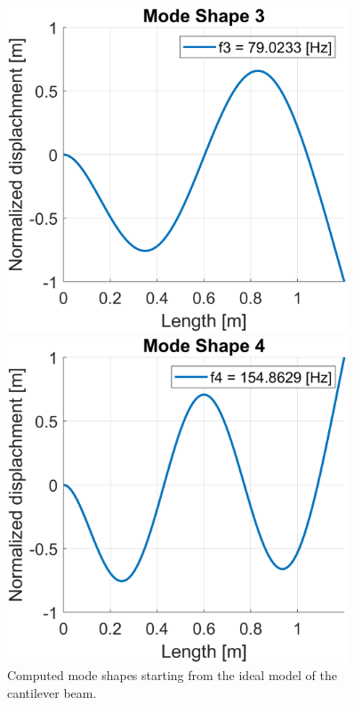 \begin{figure}[H]
\begin{minipage}[b]{0.45\textwidth}
    \end{minipage}
    \begin{minipage}[b]{0.45\textwidth}
        \centering
        \includegraphics[width=0.9\textwidth]{img/MATLAB/Part_A/Mode_shapes/mode_shape_03.png}
    \end{minipage}
    \hfill
    \begin{minipage}[b]{0.45\textwidth}
        \centering
        \includegraphics[width=0.9\textwidth]{img/MATLAB/Part_A/Mode_shapes/mode_shape_04.png}
    \end{minipage}
    \caption{Computed mode shapes starting from the ideal model of the cantilever beam.}
    \label{fig:ideal_mode_shapes}
\end{figure}
